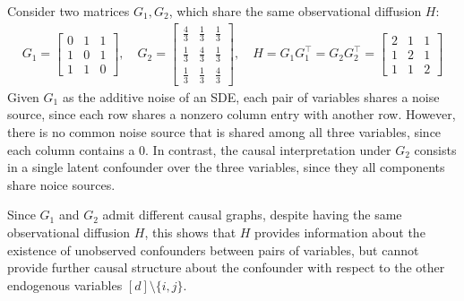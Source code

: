 \documentclass[twoside,11pt]{article}
\begin{document}


\begin{ex}
\label{ex: 3_bidirected_vs_multiedge}
Consider two matrices $G_1, G_2$, which share the same observational diffusion $H$:
\begin{align*}
    G_1 = \begin{bmatrix} 0 & 1 & 1 \\ 1 & 0 & 1 \\ 1 & 1 & 0 
\end{bmatrix}, \quad
G_2 = \begin{bmatrix}
    \frac{4}{3} & \frac{1}{3} & \frac{1}{3}\\
    \frac{1}{3} & \frac{4}{3} & \frac{1}{3}\\
    \frac{1}{3} & \frac{1}{3} & \frac{4}{3}
\end{bmatrix}, \quad H=G_1G_1^\top  = G_2G_2^\top =\begin{bmatrix} 2 & 1 & 1 \\ 1 & 2 & 1 \\ 1 & 1 & 2 
\end{bmatrix}
\end{align*}
Given $G_1$ as the additive noise of an SDE, each pair of variables shares a noise source, since each row shares a nonzero column entry with another row. However, there is no common noise source that is shared among all three variables, since each column contains a $0$. In contrast, the causal interpretation under $G_2$ consists in a single latent confounder over the three variables, since they all components share noice sources.

Since $G_1$ and $G_2$ admit different causal graphs, despite having the same observational diffusion $H$, this shows that $H$ provides information about the existence of unobserved confounders between pairs of variables, but cannot provide further causal structure about the confounder with respect to the other endogenous variables $[d] \setminus \{i, j\}$.
\end{ex}
\end{document}
